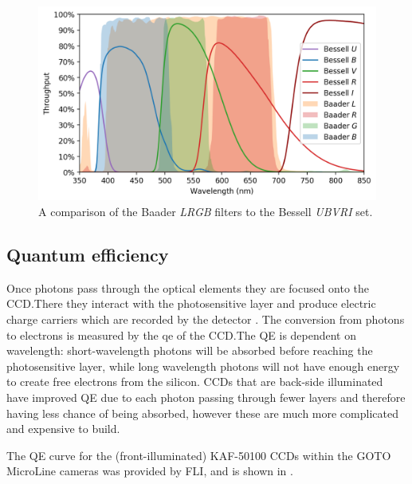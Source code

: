 \begin{colsection}
\begin{colsection}
\begin{figure}[t]
    \begin{center}
        \includegraphics[width=\textwidth]{images/throughput/filt_comp2.png}
    \end{center}
    \caption[Comparison of Baader and Bessell filters]{
        A comparison of the Baader \textit{LRGB} filters to the Bessell \textit{UBVRI} set.
    }\label{fig:filter_comparison2}
\end{figure}

\clearpage

\end{colsection}

\newpage
\subsection{Quantum efficiency}
\label{sec:qe}
\begin{colsection}

Once photons pass through the optical elements they are focused onto the CCD.\@ There they interact with the photosensitive layer and produce electric charge carriers which are recorded by the detector \citep{CCDs}. The conversion from photons to electrons is measured by the \gls{qe} of the CCD.\@ The QE is dependent on wavelength: short-wavelength photons will be absorbed before reaching the photosensitive layer, while long wavelength photons will not have enough energy to create free electrons from the silicon. CCDs that are back-side illuminated have improved QE due to each photon passing through fewer layers and therefore having less chance of being absorbed, however these are much more complicated and expensive to build.

The QE curve for the (front-illuminated) KAF-50100 CCDs within the GOTO MicroLine cameras was provided by FLI, and is shown in . %


\end{colsection}
\end{colsection}
